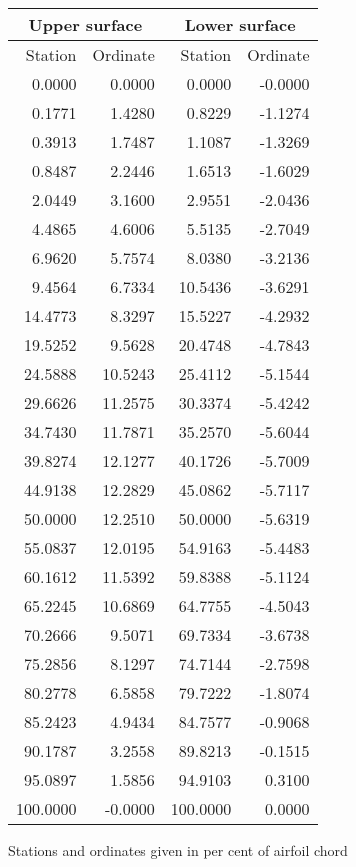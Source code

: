 \documentclass[11pt]{book}
\begin{document}
 \hspace{4mm}
 \begin{tabular}{|r|r|r|r|} \hline 
 \multicolumn{2}{|c|}{Upper surface} & \multicolumn{2}{|c|}{Lower surface} \\
 \hline
 Station & Ordinate & Station & Ordinate \\
 \hline
0.0000 & 0.0000 & 0.0000 & -0.0000 \\
0.1771 & 1.4280 & 0.8229 & -1.1274 \\
0.3913 & 1.7487 & 1.1087 & -1.3269 \\
0.8487 & 2.2446 & 1.6513 & -1.6029 \\
2.0449 & 3.1600 & 2.9551 & -2.0436 \\
4.4865 & 4.6006 & 5.5135 & -2.7049 \\
6.9620 & 5.7574 & 8.0380 & -3.2136 \\
9.4564 & 6.7334 & 10.5436 & -3.6291 \\
14.4773 & 8.3297 & 15.5227 & -4.2932 \\
19.5252 & 9.5628 & 20.4748 & -4.7843 \\
24.5888 & 10.5243 & 25.4112 & -5.1544 \\
29.6626 & 11.2575 & 30.3374 & -5.4242 \\
34.7430 & 11.7871 & 35.2570 & -5.6044 \\
39.8274 & 12.1277 & 40.1726 & -5.7009 \\
44.9138 & 12.2829 & 45.0862 & -5.7117 \\
50.0000 & 12.2510 & 50.0000 & -5.6319 \\
55.0837 & 12.0195 & 54.9163 & -5.4483 \\
60.1612 & 11.5392 & 59.8388 & -5.1124 \\
65.2245 & 10.6869 & 64.7755 & -4.5043 \\
70.2666 & 9.5071 & 69.7334 & -3.6738 \\
75.2856 & 8.1297 & 74.7144 & -2.7598 \\
80.2778 & 6.5858 & 79.7222 & -1.8074 \\
85.2423 & 4.9434 & 84.7577 & -0.9068 \\
90.1787 & 3.2558 & 89.8213 & -0.1515 \\
95.0897 & 1.5856 & 94.9103 & 0.3100 \\
100.0000 & -0.0000 & 100.0000 & 0.0000 \\
 \hline 
 \end{tabular}
 \vspace{8mm}

Stations and ordinates given in per cent of airfoil chord
\end{document}
